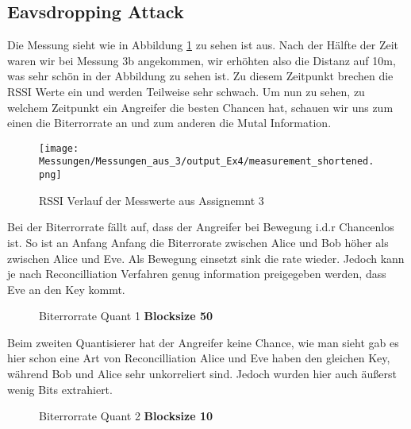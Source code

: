 \documentclass[12pt,a4paper]{article}
\begin{document}
\subsection*{Eavsdropping Attack}
Die Messung sieht wie in Abbildung \ref{test7} zu sehen ist aus. Nach der Hälfte der Zeit waren wir bei Messung 3b angekommen, wir erhöhten also die Distanz auf 10m, was sehr schön in der Abbildung zu sehen ist. Zu diesem Zeitpunkt brechen die RSSI Werte ein und werden Teilweise sehr schwach. Um nun zu sehen, zu welchem Zeitpunkt ein Angreifer die besten Chancen hat, schauen wir uns zum einen die Biterrorrate an und zum anderen die Mutal Information.
\begin{figure}[H]
\centering
\texttt{[image: Messungen/Messungen\_aus\_3/output\_Ex4/measurement\_shortened.png]}
\caption{RSSI Verlauf der Messwerte aus Assignemnt 3}
\label{test7}
\end{figure}
Bei der Biterrorrate fällt auf, dass der Angreifer bei Bewegung i.d.r Chancenlos ist. So ist an Anfang Anfang die Biterrorate zwischen Alice und Bob höher als zwischen Alice und Eve. Als Bewegung einsetzt sink die rate wieder. Jedoch kann je nach Reconcilliation Verfahren genug information preigegeben werden, dass Eve an den Key kommt.
\begin{figure}[H]
\centering
{} \qquad
{}  
\caption{Biterrorrate Quant 1 \textbf{Blocksize 50}}
\label{fig:7}
\end{figure}
Beim zweiten Quantisierer hat der Angreifer keine Chance, wie man sieht gab es hier schon eine Art von Reconcilliation Alice und Eve haben den gleichen Key, während Bob und Alice sehr unkorreliert sind. Jedoch wurden hier auch äußerst wenig Bits extrahiert.
\begin{figure}[H]
\centering
{} \qquad
{}  
\caption{Biterrorrate Quant 2 \textbf{Blocksize 10}}
\label{fig:8}
\end{figure}
\end{document}
